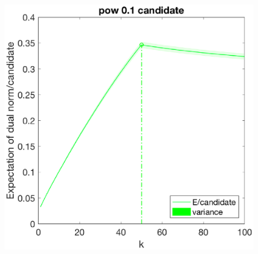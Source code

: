 \documentclass[12pt]{article}
\begin{document}
\begin{figure}[h]
\begin{minipage}[c]{.3\linewidth}
    \end{minipage}
    \hfill%
    \begin{minipage}[c]{.3\linewidth}
        \centering
        \includegraphics[width=\linewidth]{Fig/dualnorm-u0ones-k0-50-candidatepow.eps}
    \end{minipage}
\end{figure}
\end{document}
